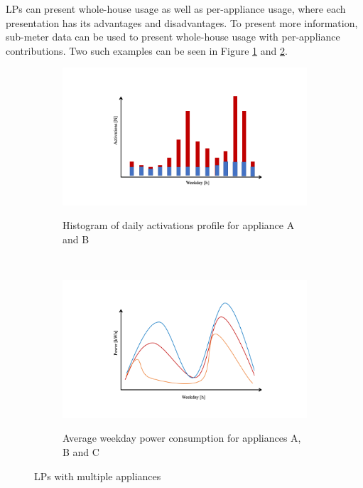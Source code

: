 LPs can present whole-house usage as well as per-appliance usage, where each presentation has its advantages and disadvantages. 
To present more information, sub-meter data can be used to present whole-house usage with per-appliance contributions.
Two such examples can be seen in Figure \ref{fig:daily_act_m_profile} and \ref{fig:daily_power_m_profile}.

\begin{figure}[H]
	\begin{subfigure}{.5\textwidth}
		\caption{Histogram of daily activations profile for appliance A and B}
		\includegraphics[width=1.1\textwidth]{Figures/profile_sketches/Slide8.png}
		\label{fig:daily_act_m_profile}
	\end{subfigure}%
	~ 
	\begin{subfigure}{.5\textwidth}
		\caption{Average weekday power consumption for appliances A, B and C}
		\includegraphics[width=1.1\textwidth]{Figures/profile_sketches/Slide2.png}
		\label{fig:daily_power_m_profile}
	\end{subfigure}%
	\label{fig:daily_m_profile}
	\caption{LPs with multiple appliances}
\end{figure}

